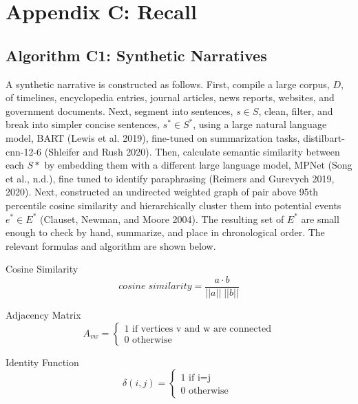 \documentclass{article}
\begin{document}
\hypertarget{appendix-c-recall}{%
\section{Appendix C: Recall}\label{appendix-c-recall}}

\hphantom{em}

\hypertarget{algorithm-c1-synthetic-narratives}{%
\subsection{Algorithm C1: Synthetic
Narratives}\label{algorithm-c1-synthetic-narratives}}

\hphantom{em}

A synthetic narrative is constructed as follows. First, compile a large
corpus, \(D\), of timelines, encyclopedia entries, journal articles,
news reports, websites, and government documents. Next, segment into
sentences, \(s \in S\), clean, filter, and break into simpler concise
sentences, \(s^* \in S^*\), using a large natural language model, BART
(Lewis et al. 2019), fine-tuned on summarization tasks,
distilbart-cnn-12-6 (Shleifer and Rush 2020). Then, calculate semantic
similarity between each \(S*\) by embedding them with a different large
language model, MPNet (Song et al., n.d.), fine tuned to identify
paraphrasing (Reimers and Gurevych 2019, 2020). Next, constructed an
undirected weighted graph of pair above 95th percentile cosine
similarity and hierarchically cluster them into potential events
\(e^* \in E^*\) (Clauset, Newman, and Moore 2004). The resulting set of
\(E^*\) are small enough to check by hand, summarize, and place in
chronological order. The relevant formulas and algorithm are shown
below.

Cosine Similarity \begin{equation}
cosine\;similarity = \frac{a \cdot b}{ || a  ||\;|| b  || }
\end{equation}

Adjacency Matrix \begin{equation} \label{eq:sclrec2}
A_{vw}= \begin{cases} 1 \text{ if vertices v and w are connected} \\ 0 \text{ otherwise } \end{cases}
\end{equation}

Identity Function \begin{equation}
\delta(i,j)= \begin{cases} 1 \text{ if i=j} \\ 0 \text{ otherwise } \end{cases}
\end{equation}
\end{document}
